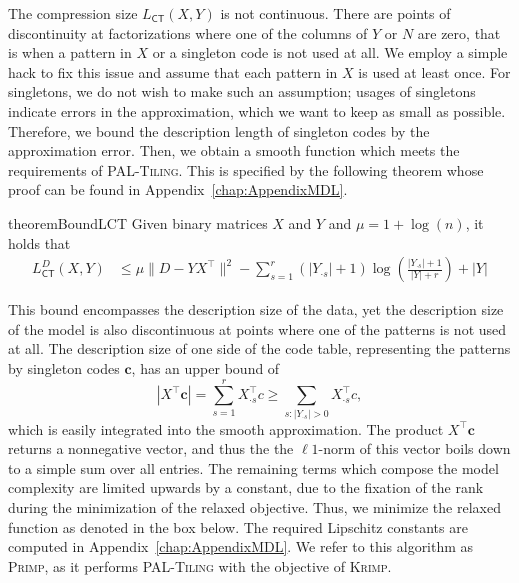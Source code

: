 The compression size $L_{\mathsf{CT}}(X,Y)$ is not continuous. There are points of discontinuity at factorizations where one of the columns of $Y$ or $N$ are zero, that is when a pattern in $X$ or a singleton code is not used at all. We employ a simple hack to fix this issue and assume that each pattern in $X$ is used at least once. For singletons, we do not wish to make such an assumption; usages of singletons indicate errors in the approximation, which we want to keep as small as possible. Therefore, we bound the description length of singleton codes by the approximation error. Then, we obtain a smooth function which meets the requirements of \textsc{PAL-Tiling}. This is specified by the following theorem whose proof can be found in Appendix~\ref{chap:AppendixMDL}. 
\begin{restatable}{theorem}{BoundLCT}\label{thm:bound}
Given binary matrices $X$ and $Y$ and $\mu = 1+\log(n)$, it holds that 
\begin{align} \label{eq:approxLN}
		L^D_{\mathsf{CT}}(X,Y) &\leq \mu \|D-YX^\top \|^2-\sum_{s=1}^r(|Y_{\cdot s}|+1)\log\left(\frac{|Y_{\cdot s}|+1}{|Y|+r}\right)+|Y|
\end{align} 
\end{restatable}
This bound encompasses the description size of the data, yet the description size of the model is also discontinuous at points where one of the patterns is not used at all. The description size of one side of the code table, representing the patterns by singleton codes $\mathbf{c}$, has an upper bound of 
\[|X^\top \mathbf{c}|=\sum_{s=1}^rX_{\cdot s}^\top c\geq\sum_{s:|Y_{\cdot s}|>0}X_{\cdot s}^\top c,\] 
which is easily integrated into the smooth approximation. The product $X^\top \mathbf{c}$ returns a nonnegative vector, and thus the the $\ell 1$-norm of this vector boils down to a simple sum over all entries. 
The remaining terms which compose the model complexity are limited upwards by a constant, due to the fixation of the rank during the minimization of the relaxed objective.
Thus, we minimize the relaxed function as denoted in the box below. 
The required Lipschitz constants are computed in Appendix~\ref{chap:AppendixMDL}. We refer to this algorithm as \textsc{Primp}, as it performs \textsc{PAL-Tiling} with the objective of \textsc{Krimp}.   

